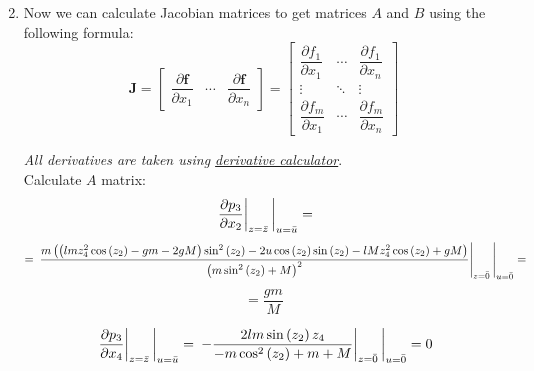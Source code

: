 \documentclass[12pt,letterpaper]{article}
\begin{document}
\begin{enumerate}
\begin{equation*}
        \end{equation*}
    \item Now we can calculate Jacobian matrices to get matrices $A$ and $B$ using the following formula:
    \begin{equation*}
        \mathbf {J} ={\begin{bmatrix}{\dfrac {\partial \mathbf {f} }{\partial x_{1}}}&\cdots &{\dfrac {\partial \mathbf {f} }{\partial x_{n}}}\end{bmatrix}}={\begin{bmatrix}{\dfrac {\partial f_{1}}{\partial x_{1}}}&\cdots &{\dfrac {\partial f_{1}}{\partial x_{n}}}\\\vdots &\ddots &\vdots \\{\dfrac {\partial f_{m}}{\partial x_{1}}}&\cdots &{\dfrac {\partial f_{m}}{\partial x_{n}}}\end{bmatrix}}
    \end{equation*}
    
    \textit{All derivatives are taken using \href{https://www.derivative-calculator.net/}{derivative calculator}}.\\
    Calculate $A$ matrix:
    \begin{equation*}
        \eval{\eval{\pdv{p_3}{x_2}}_{z = \bar z}}_{ u = \bar u} =    
    \end{equation*}
    \begin{equation*}
        \displaystyle
            =\eval{\eval{\frac{m\left(\left(lmz_4^2\cos\left(z_2\right)-gm-2gM\right)\sin^2\left(z_2\right)-2u\cos\left(z_2\right)\sin\left(z_2\right)-lMz_4^2\cos\left(z_2\right)+gM\right)}{\left(m\sin^2\left(z_2\right)+M\right)^2}}_{z = \bar 0}}_{u= \bar 0} = 
    \end{equation*}
    \begin{equation*}
        = \frac{gm}{M}
    \end{equation*}

    \begin{equation*}
        \eval{\eval{\pdv{p_3}{x_4}}_{z = \bar z}}_{ u = \bar u} = \eval{\eval{-\dfrac{2lm\sin\left(z_2\right)z_4}{-m\cos^2\left(z_2\right)+m+M}}_{z = \bar 0}}_{u = \bar 0} = 0
    \end{equation*}
    

\end{enumerate}
\end{document}
